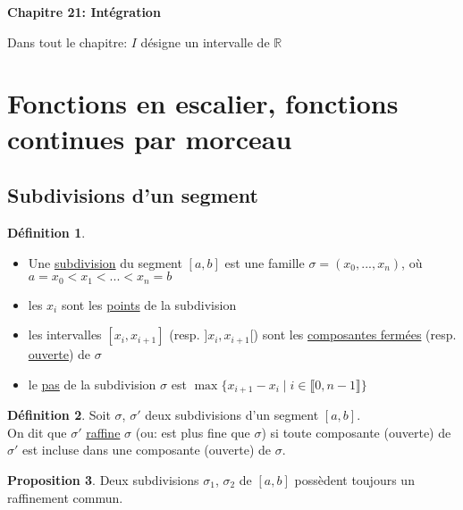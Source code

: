 \documentclass[10pt,a4paper]{article}
\theoremstyle{definition}
\newtheorem{proposition}{Proposition}[section]
\newtheorem{definition}[proposition]{Définition}
\begin{document}
\renewcommand{\labelitemi}{$*$}
\begin{center}
{\Large \textbf{Chapitre 21: Intégration}}
\end{center}
Dans tout le chapitre: $I$ désigne un intervalle de $\mathbb{R}$

\section{Fonctions en escalier, fonctions continues par morceau}
\subsection{Subdivisions d'un segment}
\begin{definition}
\hfill
\begin{itemize}
\item Une \uline{subdivision} du segment $[a, b]$ est une famille $\sigma = (x_{0}, ... , x_{n})$, où \\ $a = x_{0} < x_{1} < ... < x_{n} = b$
\item les $x_{i}$ sont les \uline{points} de la subdivision
\item les intervalles $[x_{i}, x_{i+1}]$ (resp. $]x_{i}, x_{i+1}[$) sont les \uline{composantes fermées} (resp. \uline{ouverte}) de $\sigma$
\item le \uline{pas} de la subdivision $\sigma$ est $\max{\{x_{i+1} - x_{i} \mid i \in \llbracket 0, n-1 \rrbracket\}}$
\end{itemize}
\end{definition}
\begin{definition}
Soit $\sigma$, $\sigma'$ deux subdivisions d'un segment $[a, b]$. \\
On dit que $\sigma'$ \uline{raffine} $\sigma$ (ou: est plus fine que $\sigma$) si toute composante (ouverte) de $\sigma'$ est incluse dans une composante (ouverte) de $\sigma$.
\end{definition}
\begin{proposition}
Deux subdivisions $\sigma_{1}$, $\sigma_{2}$ de $[a, b]$ possèdent toujours un raffinement commun.
\end{proposition}
\end{document}
